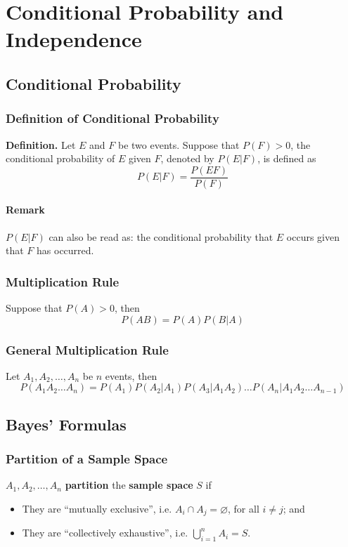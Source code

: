 \documentclass[../st2131_notes.tex]{subfiles}
\begin{document}
\chapter{Conditional Probability and Independence}
\section{Conditional Probability}

\subsection{Definition of Conditional Probability}
\textbf{Definition.} Let \(E\) and \(F\) be two events. Suppose that \(P(F)>0\), the conditional probability of \(E\) given \(F\), denoted by \(P(E\vert F)\), is defined as
\[P(E\vert F)=\frac{P(EF)}{P(F)}\]

\subsubsection{Remark}
\(P(E\vert F)\) can also be read as: the conditional probability that \(E\) occurs given that \(F\) has occurred.

\subsection{Multiplication Rule}
Suppose that \(P(A)>0\), then
\[P(AB)=P(A)P(B\vert A)\]

\subsection{General Multiplication Rule}
Let \(A_1,A_2,\ldots,A_n\) be \(n\) events, then
\[P(A_1A_2\ldots A_n)=P(A_1)P(A_2\vert A_1)P(A_3\vert A_1A_2)\ldots P(A_n\vert A_1A_2\ldots A_{n-1})\]

\section{Bayes' Formulas}
\subsection{Partition of a Sample Space}
\(A_1,A_2,\ldots,A_n\) \textbf{partition} the \textbf{sample space} \(S\) if
\begin{itemize}
	\item They are ``mutually exclusive'', i.e. \(A_i\cap A_j=\varnothing\), for all \(i\ne j\); and
	\item They are ``collectively exhaustive'', i.e. \(\bigcup\limits_{i=1}^nA_i=S\).
\end{itemize}
\end{document}
